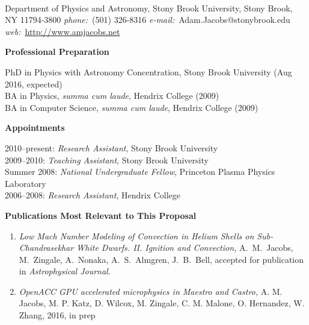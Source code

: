 \documentclass[11pt,letterpaper,english]{article}
\begin{document}
\setlength{\parindent}{0in} %

\pagestyle{fancy}   \renewcommand{%
\headrulewidth}{0.0pt}


\thispagestyle{plain}

\\
{Department of Physics and Astronomy, Stony Brook University, Stony Brook, NY 11794-3800} \smallskip
{{\it phone:}~(501) 326-8316 \hskip 2mm
{\it e-mail:}~Adam.Jacobs@stonybrook.edu \hskip 2mm \\[-0.25em]
{\it web:}~\url{http://www.amjacobs.net}}

\begin{flushleft} {\bf Professional Preparation}
{\parindent 16pt

PhD in Physics with Astronomy Concentration, Stony Brook University (Aug 2016, expected)\\ 
BA in Physics, \emph{summa cum laude}, Hendrix College (2009)\\ 
BA in Computer Science, \emph{summa cum laude}, Hendrix College (2009)\\ 
}

\vspace{.04in}
{\bf Appointments}
{\parindent 16pt

2010--present: {\em Research Assistant}, Stony Brook University \\ 
2009--2010: {\em Teaching Assistant}, Stony Brook University \\ 
Summer 2008:  {\em National Undergraduate Fellow}, Princeton Plasma Physics Laboratory \\ 
2006--2008: {\em Research Assistant}, Hendrix College \\
}

\vspace{.04in}
{\bf Publications Most Relevant to This Proposal}
\vspace{-6pt}
\begin{enumerate} \itemsep1pt \parskip0pt 
\item {\it Low Mach Number Modeling of Convection in Helium Shells on
      Sub-Chandrasekhar White Dwarfs. II. Ignition and Convection,} A.~M.~Jacobs,
      M.~Zingale, A.~Nonaka, A.~S.~Almgren, J.~B.~Bell, accepted for publication
      in {\it Astrophysical Journal}.

\item {\it OpenACC GPU accelerated microphysics in Maestro and Castro,} A. M. Jacobs, M. P. Katz,
   D. Wilcox, M. Zingale, C. M. Malone, O. Hernandez, W. Zhang, 2016, in prep


\end{enumerate}
\end{flushleft}
\end{document}
